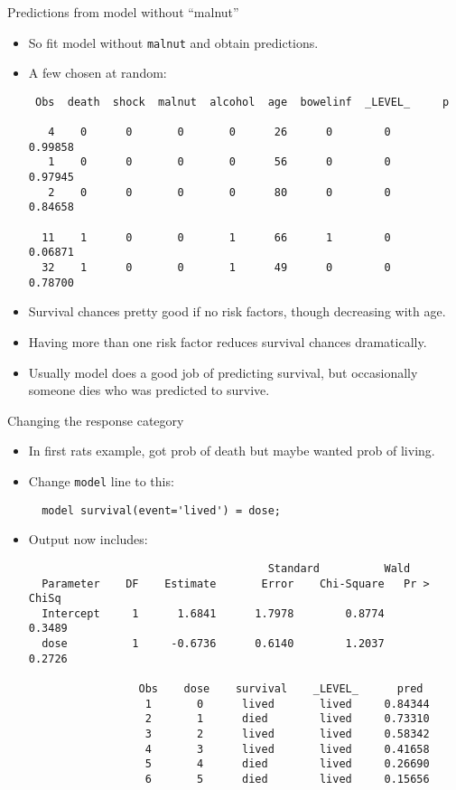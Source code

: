 \documentclass[pdf]{prosper}
\begin{document}
\begin{slide}{Predictions from model without ``malnut''}

  \begin{itemize}
  \item So fit model without \verb-malnut- and obtain predictions.
  \item A few chosen at random:
{\scriptsize
\begin{verbatim}
 Obs  death  shock  malnut  alcohol  age  bowelinf  _LEVEL_     p

   4    0      0       0       0      26      0        0     0.99858
   1    0      0       0       0      56      0        0     0.97945
   2    0      0       0       0      80      0        0     0.84658

  11    1      0       0       1      66      1        0     0.06871
  32    1      0       0       1      49      0        0     0.78700
\end{verbatim}
}
\item Survival chances pretty good if no risk factors, though decreasing with age.
\item Having more than one risk factor reduces survival chances dramatically.
\item Usually model does a good job of predicting survival, but occasionally someone dies who was predicted to survive.
  \end{itemize}
  
\end{slide}


\begin{slide}{Changing the response category}

  \begin{itemize}
  \item 
In first rats example, got prob of death but maybe wanted prob of living.
\item Change \verb-model- line to this:
\begin{verbatim}
  model survival(event='lived') = dose;
\end{verbatim}
\item Output now includes:
{\scriptsize
\begin{verbatim}
                                     Standard          Wald
  Parameter    DF    Estimate       Error    Chi-Square   Pr > ChiSq
  Intercept     1      1.6841      1.7978        0.8774       0.3489
  dose          1     -0.6736      0.6140        1.2037       0.2726

                 Obs    dose    survival    _LEVEL_      pred
                  1       0      lived       lived     0.84344
                  2       1      died        lived     0.73310
                  3       2      lived       lived     0.58342
                  4       3      lived       lived     0.41658
                  5       4      died        lived     0.26690
                  6       5      died        lived     0.15656

\end{verbatim}
}

  \end{itemize}

  
\end{slide}
\end{document}
